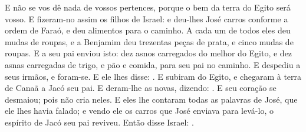 {{{  E não se vos dê nada de vossos pertences, porque o bem da terra do Egito será vosso}.
  E fizeram-no assim os filhos de Israel: e deu-lhes José carros conforme a ordem de Faraó, e deu alimentos para o caminho.
  A cada um de todos eles deu mudas de roupas, e a Benjamim deu trezentas peças de prata, e cinco mudas de roupas.
  E a seu pai enviou isto: dez asnos carregados do melhor do Egito, e dez asnas carregadas de trigo, e pão e comida, para seu pai no caminho.
  E despediu a seus irmãos, e foram-se. E ele lhes disse: .
  E subiram do Egito, e chegaram à terra de Canaã a Jacó seu pai.
  E deram-lhe as novas, dizendo: . E seu coração se desmaiou; pois não cria neles.
  E eles lhe contaram todas as palavras de José, que ele lhes havia falado; e vendo ele os carros que José enviava para levá-lo, o espírito de Jacó seu pai reviveu.
  Então disse Israel: .
\par }

}
